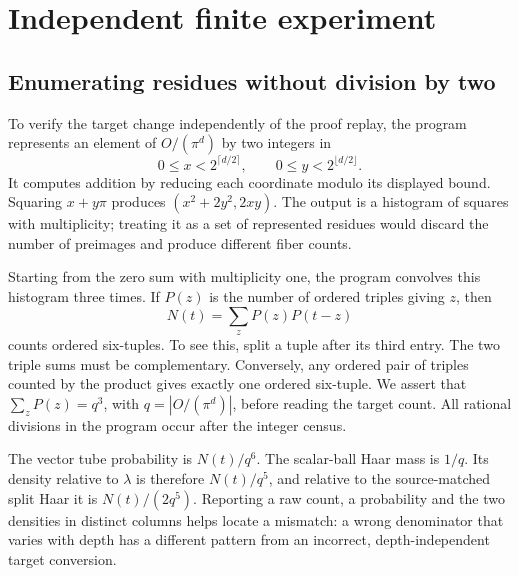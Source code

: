 \documentclass[12pt,letterpaper]{article}
\begin{document}
\section{Independent finite experiment}
\subsection{Enumerating residues without division by two}
To verify the target change independently of the proof replay, the program represents an element of $O/(\pi^d)$ by two integers in
\[
   0\le x<2^{\lceil d/2\rceil},\qquad 0\le y<2^{\lfloor d/2\rfloor}.
\]
It computes addition by reducing each coordinate modulo its displayed bound. Squaring $x+y\pi$ produces $(x^2+2y^2,2xy)$. The output is a histogram of squares with multiplicity; treating it as a set of represented residues would discard the number of preimages and produce different fiber counts.

Starting from the zero sum with multiplicity one, the program convolves this histogram three times. If $P(z)$ is the number of ordered triples giving $z$, then
\[
         N(t)=\sum_z P(z)P(t-z)
\]
counts ordered six-tuples. To see this, split a tuple after its third entry. The two triple sums must be complementary. Conversely, any ordered pair of triples counted by the product gives exactly one ordered six-tuple. We assert that $\sum_zP(z)=q^3$, with $q=|O/(\pi^d)|$, before reading the target count. All rational divisions in the program occur after the integer census.

The vector tube probability is $N(t)/q^6$. The scalar-ball Haar mass is $1/q$. Its density relative to $\lambda$ is therefore $N(t)/q^5$, and relative to the source-matched split Haar it is $N(t)/(2q^5)$. Reporting a raw count, a probability and the two densities in distinct columns helps locate a mismatch: a wrong denominator that varies with depth has a different pattern from an incorrect, depth-independent target conversion.
\end{document}

